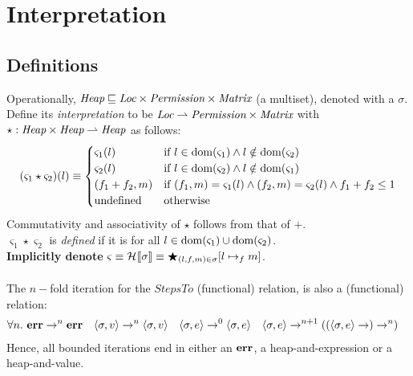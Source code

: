 \section{Interpretation}

\subsection{Definitions}


Operationally, $\emph{Heap} \sqsubseteq \emph{Loc} \times \emph{Permission}
\times \emph{Matrix} $ (a multiset), denoted with a $\sigma$.\\
Define its \emph{interpretation} to be $\emph{Loc} \rightharpoonup
\emph{Permission} \times \emph{Matrix}$ with $\star:
\emph{Heap} \times \emph{Heap} \rightharpoonup \emph{Heap}$ as follows:
\[
    (\varsigma_1 \star \varsigma_2)(l) \equiv
    \begin{cases}
        \varsigma_1(l) & \textrm{if } l \in \mathrm{dom}(\varsigma_1) \wedge l \notin \mathrm{dom}(\varsigma_2) \\
        \varsigma_2(l) & \textrm{if } l \in \mathrm{dom}(\varsigma_2) \wedge l \notin \mathrm{dom}(\varsigma_1) \\
        (f_1 + f_2, m) & \textrm{if } (f_1, m) = \varsigma_1(l) \wedge (f_2, m) = \varsigma_2(l) \wedge f_1 + f_2 \leq 1 \\
        \textrm{undefined} & \textrm{otherwise}
    \end{cases}
\]
Commutativity and associativity of $\star$ follows from that of $+$.\\
$\varsigma_1 \star \varsigma_2$ is \emph{defined} if it is for all $l \in
\mathrm{dom}(\varsigma_1) \cup \mathrm{dom}(\varsigma_2)$.\\
\textbf{Implicitly denote} $\varsigma \equiv \mathcal{H}_{} [\![ \sigma ]\!] \equiv
\bigstar_{(l,f,m) \in \sigma} [ l \mapsto_f m ]$.\\
\\
The $n-$fold iteration for the $StepsTo$ (functional) relation, is also a (functional) relation:
\begin{align*}
    \forall n.\ \mathbf{err} &\rightarrow^n \mathbf{err} &
    \langle \sigma , v \rangle &\rightarrow^n \langle \sigma , v \rangle &
    \langle \sigma , e \rangle &\rightarrow^0 \langle \sigma , e \rangle &
    \langle \sigma , e \rangle &\rightarrow^{n+1} ((\langle \sigma , e \rangle \rightarrow) \rightarrow^n)
\end{align*}
Hence, all bounded iterations end in either an $\mathbf{err}$, a heap-and-expression or a
heap-and-value.

